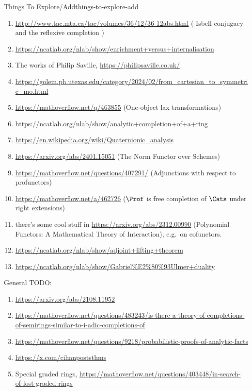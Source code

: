 \begin{remark}{Things To Explore/Add}{things-to-explore-add}
\begin{enumerate}
        \item \url{http://www.tac.mta.ca/tac/volumes/36/12/36-12abs.html} ( Isbell conjugacy and the reflexive completion )
        \item \url{https://ncatlab.org/nlab/show/enrichment+versus+internalisation}
        \item The works of Philip Saville, \url{https://philipsaville.co.uk/}
        \item \url{https://golem.ph.utexas.edu/category/2024/02/from\_cartesian\_to\_symmetric\_mo.html}
        \item \url{https://mathoverflow.net/q/463855} (One-object lax transformations)
        \item \url{https://ncatlab.org/nlab/show/analytic+completion+of+a+ring}
        \item \url{https://en.wikipedia.org/wiki/Quaternionic\_analysis}
        \item \url{https://arxiv.org/abs/2401.15051} (The Norm Functor over Schemes)
        \item \url{https://mathoverflow.net/questions/407291/} (Adjunctions with respect to profunctors)
        \item \url{https://mathoverflow.net/a/462726} ($\Prof$ is free completion of $\Cats$ under right extensions)
        \item there's some cool stuff in \url{https://arxiv.org/abs/2312.00990} (Polynomial Functors: A Mathematical Theory of Interaction), e.g.\ on cofunctors.
        \item \url{https://ncatlab.org/nlab/show/adjoint+lifting+theorem}
        \item \url{https://ncatlab.org/nlab/show/Gabriel\%E2\%80\%93Ulmer+duality}
    \end{enumerate}
    General TODO:
    \begin{enumerate}
        \item \url{https://arxiv.org/abs/2108.11952}
        \item \url{https://mathoverflow.net/questions/483243/is-there-a-theory-of-completions-of-semirings-similar-to-i-adic-completions-of}
        \item \url{https://mathoverflow.net/questions/9218/probabilistic-proofs-of-analytic-facts}
        \item \url{https://x.com/cihanpoststhms}
        \item Special graded rings, \url{https://mathoverflow.net/questions/403448/in-search-of-lost-graded-rings}
            \begin{enumerate}

\end{enumerate}
\end{enumerate}
\end{remark}
